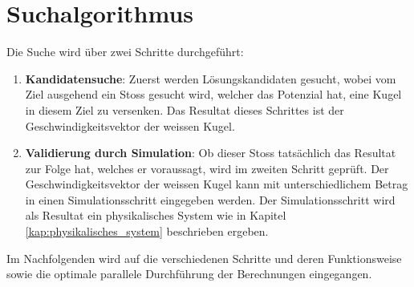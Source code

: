 \clearpage
\section{Suchalgorithmus}\label{kap:algorithmus_suche}
Die Suche wird über zwei Schritte durchgeführt:

\begin{enumerate}
    \item \textbf{Kandidatensuche}: Zuerst werden Lösungskandidaten gesucht, wobei vom Ziel ausgehend ein Stoss gesucht wird,
    welcher das Potenzial hat, eine Kugel in diesem Ziel zu versenken.
    Das Resultat dieses Schrittes ist der Geschwindigkeitsvektor der weissen Kugel.
    \item \textbf{Validierung durch Simulation}: Ob dieser Stoss tatsächlich das Resultat zur Folge hat, welches er voraussagt, wird im zweiten Schritt geprüft. Der
    Geschwindigkeitsvektor der weissen Kugel kann mit unterschiedlichem Betrag in einen Simulationsschritt eingegeben werden.
    Der Simulationsschritt wird als Resultat ein physikalisches System wie in Kapitel \ref{kap:physikalisches_system}
    beschrieben ergeben.
\end{enumerate}

Im Nachfolgenden wird auf die verschiedenen Schritte und deren Funktionsweise sowie die optimale parallele Durchführung
der Berechnungen eingegangen.





\newpage

\newpage

\newpage
